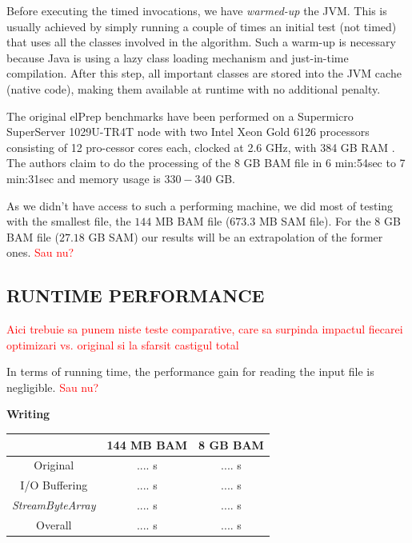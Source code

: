 \documentclass[a4paper,twoside]{article}
\begin{document}
Before executing the timed invocations, we have {\it warmed-up} the JVM. 
This is usually achieved by simply running a couple of times an initial test (not timed) that uses all the classes involved in the algorithm. Such a warm-up is necessary because Java is using a lazy class loading mechanism and just-in-time compilation. After this step, all important classes are stored into the JVM cache (native code), making them available at runtime with no additional penalty.

The original elPrep benchmarks have been performed on a Supermicro SuperServer 1029U-TR4T node with two
Intel Xeon Gold 6126 processors consisting of 12 pro-cessor cores each, clocked at 2.6 GHz, with 384 GB
RAM \cite{costanza:2019}. The authors claim to do the processing of the 8 GB BAM file in 6 min:54sec to 7 min:31sec and memory usage is $330-340$ GB.

As we didn't have access to such a performing machine, we did most of testing with the smallest file, the $144$ MB BAM file ($673.3$ MB SAM file). For the $8$ GB BAM file ($27.18$ GB SAM) our results will be an extrapolation of the former ones. \textcolor{red}{Sau nu?}


\subsection{\uppercase{Runtime performance}}

\textcolor{red} {Aici trebuie sa punem niste teste comparative, care sa surpinda impactul fiecarei optimizari vs. original si la sfarsit castigul total}

In terms of running time, the performance gain for reading the input file is negligible.  \textcolor{red}{Sau nu?}

\par
\textbf{Writing} \\
\vspace{-0.4cm}
\begin{center}
\begin{tabular}{|c|c|c|}
\hline
						& 144 MB BAM  	& 8 GB BAM			\\ \hline
Original				& .... s		& .... s			\\ \hline
I/O Buffering       	& .... s		& .... s			\\ \hline
{\it StreamByteArray}	& .... s		& .... s			\\ \hline
Overall					& .... s		& .... s			\\ \hline
\end{tabular}
\end{center}
\end{document}
